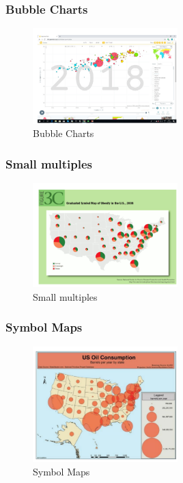 \subsubsection{Bubble Charts}
\begin{figure}[H]
    \centering
    \includegraphics[width=0.5\textwidth]{images/Bubble.png} %
    \caption{Bubble Charts}
    \label{fig:immagine}
\end{figure}
\subsubsection{Small multiples}
\begin{figure}[H]
    \centering
    \includegraphics[width=0.5\textwidth]{images/SmallMultiples2.png} %
    \caption{Small multiples}
    \label{fig:immagine}
\end{figure}
\subsubsection{Symbol Maps}
\begin{figure}[H]
    \centering
    \includegraphics[width=0.5\textwidth]{images/SymbolMaps.png} %
    \caption{Symbol Maps}
    \label{fig:immagine}
\end{figure}
